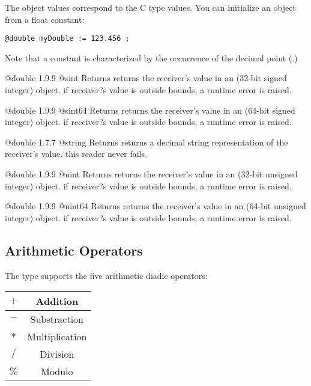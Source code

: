 
The  object values correspond to the C type  values. You can initialize an  object from a float constant:

\texttt{@double myDouble := 123.456 ;}

Note that a  constant is characterized by the occurrence of the decimal point (.)


{@double}
{1.9.9}
{@sint}
{Returns returns the receiver's value in an  (32-bit signed integer) object.}
{if receiver?s value is outside  bounds, a runtime error is raised.}



{@double}
{1.9.9}
{@sint64}
{Returns returns the receiver's value in an  (64-bit signed integer) object.}
{if receiver?s value is outside  bounds, a runtime error is raised.}




{@double}
{1.7.7}
{@string}
{Returns returns a decimal string representation of the receiver's value.}
{this reader never fails.}







{@double}
{1.9.9}
{@uint}
{Returns returns the receiver's value in an  (32-bit unsigned integer) object.}
{if receiver?s value is outside  bounds, a runtime error is raised.}





{@double}
{1.9.9}
{@uint64}
{Returns returns the receiver's value in an  (64-bit unsigned integer) object.}
{if receiver?s value is outside  bounds, a runtime error is raised.}




\subsection{Arithmetic Operators}

The  type supports the five arithmetic diadic operators:\newline

\begin{tabular}{|c|c|}
\hline
$+$ & Addition \\
\hline
$-$ & Substraction \\
\hline
$*$ & Multiplication \\
\hline
$/$ & Division \\
\hline
$\%$ & Modulo \\
\hline
\end{tabular}\newline

